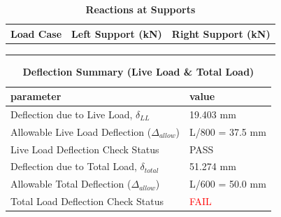 \documentclass[12pt,a4paper]{report}
\numberwithin{table}{chapter}
\numberwithin{figure}{chapter}
\begin{document}
\vspace{1em}
\begin{longtable}{|>{\centering\arraybackslash}p{5.2cm}|>{\centering\arraybackslash}p{5.2cm}|>{\centering\arraybackslash}p{5.2cm}|}
\caption{\textbf{Reactions at Supports}}\\
\hline
\textbf{Load Case} & \textbf{Left Support (kN)} & \textbf{Right Support (kN)} \\[6pt]
\hline
 &  &  \\[6pt]
\hline
 &  &  \\[6pt]
\hline
 &  &  \\[6pt]
\hline
\end{longtable}

\vspace{1em}
\begin{longtable}{|L{7cm}|p{8.5cm}|}
\caption{\textbf{Deflection Summary (Live Load \& Total Load)}}\\
\hline
\textbf{parameter} & \textbf{value} \\
\hline
\textnormal{Deflection due to Live Load, $\delta_{LL}$} & 19.403 mm \\[6pt]
\hline
\textnormal{Allowable Live Load Deflection ($\Delta_{allow}$)} & L/800 = 37.5 mm \\[6pt]
\hline
\textnormal{Live Load Deflection Check Status} & PASS \\[6pt]
\hline
\textnormal{Deflection due to Total Load, $\delta_{total}$} & 51.274 mm \\[6pt]
\hline
\textnormal{Allowable Total Deflection ($\Delta_{allow}$)} & L/600 = 50.0 mm \\[6pt]
\hline
\textnormal{Total Load Deflection Check Status} & \textcolor{red}{FAIL} \\[6pt]
\hline
\end{longtable}

\vspace{1em}
\noindent
\noindent{}
\noindent{}
\noindent{}
\end{document}
